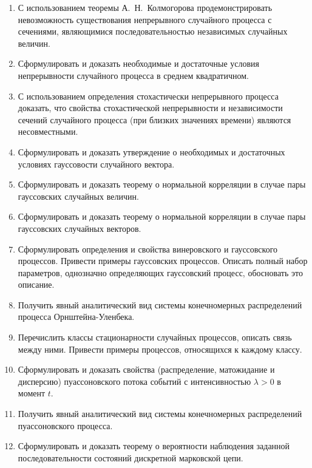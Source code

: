 \documentclass[a4paper,12pt]{extreport}
\renewcommand{\=}[1]{\stackrel{#1}{=}} %
\begin{document}
\begin{enumerate}
	\item С использованием теоремы А.~Н.~Колмогорова 
	продемонстрировать невозможность существования непрерывного случайного процесса
	с сечениями, являющимися последовательностью независимых случайных величин.

	\item Сформулировать и доказать необходимые и достаточные условия непрерывности
	случайного процесса в среднем квадратичном.

	\item С использованием определения стохастически непрерывного процесса
	доказать, что свойства стохастической непрерывности и независимости 
	сечений случайного процесса (при близких значениях времени) являются несовместными.

	\item Сформулировать и доказать утверждение о необходимых
	и достаточных условиях гауссовости случайного вектора.

	\item Сформулировать и доказать теорему о нормальной корреляции
	в случае пары гауссовских случайных величин.

	\item Сформулировать и доказать теорему о нормальной корреляции
	в случае пары гауссовских случайных векторов.

	\item Сформулировать определения и свойства винеровского
	и гауссовского процессов. Привести примеры гауссовских процессов.
	Описать полный набор параметров, однозначно определяющих гауссовский 
	процесс, обосновать это описание.

	\item Получить явный аналитический вид системы конечномерных
	распределений процесса Орнштейна-Уленбека.

	\item Перечислить классы стационарности случайных процессов,
	описать связь между ними.
	Привести примеры процессов, относящихся к каждому классу.

	\item Сформулировать и доказать свойства
	(распределение, матожидание и дисперсию) пуассоновского
	потока событий с интенсивностью $\lambda > 0$ в момент $t$.

	\item Получить явный аналитический вид системы конечномерных
	распределений пуассоновского процесса.

	\item Сформулировать и доказать теорему о вероятности 
	наблюдения заданной последовательности
	состояний дискретной марковской цепи.


\end{enumerate}
\end{document}
